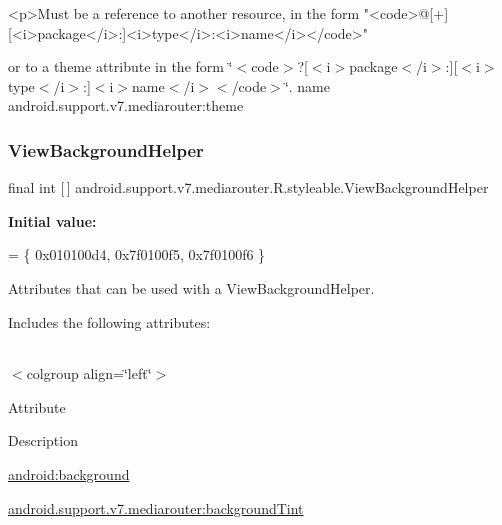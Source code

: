 \begin{DoxyVerb}      <p>Must be a reference to another resource, in the form "<code>@[+][<i>package</i>:]<i>type</i>:<i>name</i></code>"
\end{DoxyVerb}
 or to a theme attribute in the form \char`\"{}$<$code$>$?\mbox{[}$<$i$>$package$<$/i$>$\+:\mbox{]}\mbox{[}$<$i$>$type$<$/i$>$\+:\mbox{]}$<$i$>$name$<$/i$>$$<$/code$>$\char`\"{}.  name android.\+support.\+v7.\+mediarouter\+:theme \mbox{\label{classandroid_1_1support_1_1v7_1_1mediarouter_1_1R_1_1styleable_a65c1a920f4419d63dca1770bf1dd35ca}} 
\subsubsection{\texorpdfstring{View\+Background\+Helper}{ViewBackgroundHelper}}
{\footnotesize\ttfamily final int \mbox{[}$\,$\mbox{]} android.\+support.\+v7.\+mediarouter.\+R.\+styleable.\+View\+Background\+Helper\hspace{0.3cm}{\ttfamily [static]}}

{\bfseries Initial value\+:}
\begin{DoxyCode}
= \{
            0x010100d4, 0x7f0100f5, 0x7f0100f6
        \}
\end{DoxyCode}
Attributes that can be used with a View\+Background\+Helper. 

Includes the following attributes\+:

\tabulinesep=1mm
\begin{longtabu} spread 0pt [c]{*{0}{|X[-1]}|}
\hline
\end{longtabu}
$<$colgroup align=\char`\"{}left\char`\"{}$>$ 

Attribute

Description 

{\ttfamily \hyperlink{classandroid_1_1support_1_1v7_1_1mediarouter_1_1R_1_1styleable_ac2f353ef7ddd44600660b357e4075019}{android\+:background}}

{\ttfamily \hyperlink{classandroid_1_1support_1_1v7_1_1mediarouter_1_1R_1_1styleable_a257b269be5ac880e08242d049999f16c}{android.\+support.\+v7.\+mediarouter\+:background\+Tint}}

